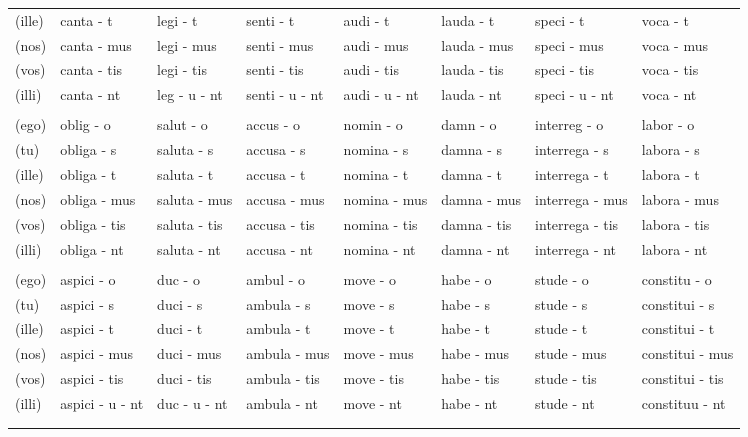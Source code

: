 \documentclass[a4paper, landscape]{article}
\begin{document}
\begin{landscape}
\begin{table}[]
\begin{tabular}{llllllll}
	(ille)	& canta - t		& legi - t		& senti - t		& audi - t		& lauda - t		& speci - t		 & voca - t \\
	(nos)	& canta - mus	& legi - mus	& senti - mus	& audi - mus	& lauda - mus	& speci - mus	 & voca - mus \\
	(vos)	& canta - tis	& legi - tis	& senti - tis	& audi - tis	& lauda - tis	& speci - tis	 & voca - tis \\
	(illi)	& canta - nt	& leg - u - nt	& senti - u - nt& audi - u - nt & lauda - nt	& speci - u - nt & voca - nt \\
	& & & &  &  &  & \\
	(ego)	& oblig  - o	& salut	 - o	& accus  - o	& nomin  - o	& damn  - o		& interreg  - o		& labor - o \\
    (tu)	& obliga - s	& saluta - s	& accusa - s	& nomina - s	& damna - s		& interrega - s		& labora - s \\
	(ille)	& obliga - t	& saluta - t	& accusa - t	& nomina - t	& damna - t		& interrega - t		& labora - t \\
	(nos)	& obliga - mus	& saluta - mus	& accusa - mus	& nomina - mus	& damna - mus	& interrega - mus	& labora - mus \\
    (vos)	& obliga - tis	& saluta - tis	& accusa - tis	& nomina - tis	& damna - tis	& interrega - tis	& labora - tis \\
    (illi)	& obliga - nt	& saluta - nt	& accusa - nt	& nomina - nt	& damna - nt	& interrega - nt	& labora - nt \\
	& & & &  &  &  & \\
	(ego)   & aspici - o		& duc  - o		& ambul  - o	& move - o		& habe - o	 & stude - o    & constitu  - o \\
	(tu)	& aspici - s		& duci - s		& ambula - s	& move - s		& habe - s   & stude - s	& constitui - s\\
	(ille)	& aspici - t		& duci - t		& ambula - t	& move - t		& habe - t   & stude - t	& constitui - t \\
	(nos)	& aspici - mus		& duci - mus	& ambula - mus	& move - mus	& habe - mus & stude - mus  & constitui - mus \\
	(vos)	& aspici - tis		& duci - tis	& ambula - tis	& move - tis	& habe - tis & stude - tis  & constitui - tis \\
	(illi)	& aspici - u -  nt 	& duc - u - nt	& ambula - nt	& move - nt		& habe - nt  & stude - nt   & constituu - nt \\
	& & & & &  &  & \\
	& & & &  &  & \\

\end{tabular}
\end{table}
\end{landscape}
\end{document}
